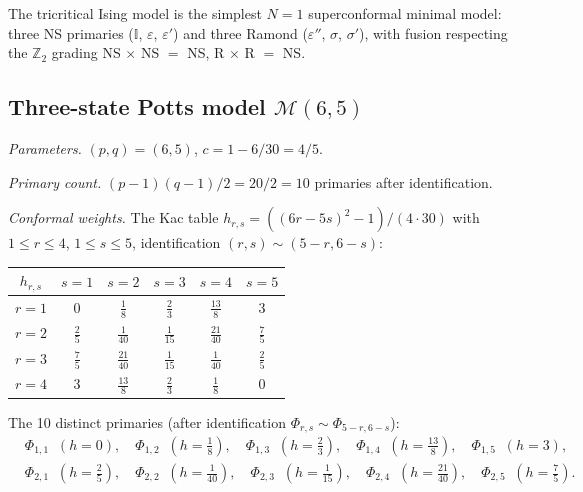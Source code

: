 \begin{remark}
\label{rem:tricritical-superconformal}
The tricritical Ising model is the simplest $N=1$ superconformal minimal model: three NS primaries ($\mathbb{I}$, $\varepsilon$, $\varepsilon'$) and three Ramond ($\varepsilon''$, $\sigma$, $\sigma'$), with fusion respecting the $\mathbb{Z}_2$ grading NS $\times$ NS $=$ NS, R $\times$ R $=$ NS.
\end{remark}


\subsection{\texorpdfstring{Three-state Potts model $\mathcal{M}(6,5)$}{Three-state Potts model M(6,5)}}
\label{subsec:three-state-potts}

\begin{computation}
\label{comp:three-state-potts}

\emph{Parameters.}
$(p,q) = (6,5)$, $c = 1 - 6/30 = 4/5$.

\emph{Primary count.}
$(p-1)(q-1)/2 = 20/2 = 10$ primaries after identification.

\emph{Conformal weights.}
The Kac table $h_{r,s} = ((6r-5s)^2 - 1)/(4 \cdot 30)$
with $1 \leq r \leq 4$, $1 \leq s \leq 5$, identification
$(r,s) \sim (5-r, 6-s)$:
\begin{center}
\renewcommand{\arraystretch}{1.3}
\begin{tabular}{c|ccccc}
$h_{r,s}$ & $s=1$ & $s=2$ & $s=3$ & $s=4$ & $s=5$ \\
\hline
$r=1$ & $0$ & $\frac{1}{8}$ & $\frac{2}{3}$ & $\frac{13}{8}$ & $3$ \\[3pt]
$r=2$ & $\frac{2}{5}$ & $\frac{1}{40}$ & $\frac{1}{15}$ & $\frac{21}{40}$ & $\frac{7}{5}$ \\[3pt]
$r=3$ & $\frac{7}{5}$ & $\frac{21}{40}$ & $\frac{1}{15}$ & $\frac{1}{40}$ & $\frac{2}{5}$ \\[3pt]
$r=4$ & $3$ & $\frac{13}{8}$ & $\frac{2}{3}$ & $\frac{1}{8}$ & $0$
\end{tabular}
\end{center}
The 10 distinct primaries (after identification
$\Phi_{r,s} \sim \Phi_{5-r,6-s}$):
\begin{align*}
&\Phi_{1,1} \;\; (h=0), \quad
\Phi_{1,2} \;\; (h=\tfrac{1}{8}), \quad
\Phi_{1,3} \;\; (h=\tfrac{2}{3}), \quad
\Phi_{1,4} \;\; (h=\tfrac{13}{8}), \quad
\Phi_{1,5} \;\; (h=3), \\
&\Phi_{2,1} \;\; (h=\tfrac{2}{5}), \quad
\Phi_{2,2} \;\; (h=\tfrac{1}{40}), \quad
\Phi_{2,3} \;\; (h=\tfrac{1}{15}), \quad
\Phi_{2,4} \;\; (h=\tfrac{21}{40}), \quad
\Phi_{2,5} \;\; (h=\tfrac{7}{5}).
\end{align*}
\end{computation}

